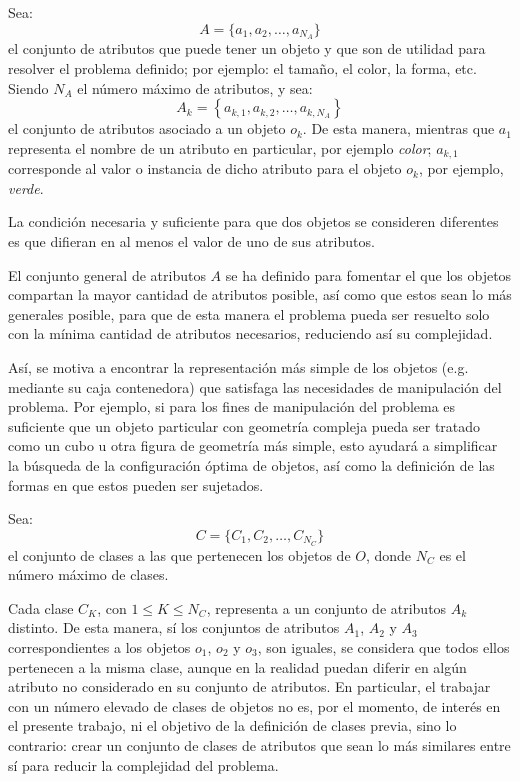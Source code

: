 Sea:
%
\begin{equation}
\label{eq:atributos}
A = \{ a_1, a_2, \ldots, a_{N_A} \}
\end{equation}
%
el conjunto de atributos que puede tener un objeto y que son de utilidad para resolver el problema definido; por ejemplo: el tamaño, el color, la forma, etc.  
Siendo $N_A$ el número máximo de atributos, y sea:
%
\begin{equation}
\label{eq:atributos_objeto}
A_k = \left\{ a_{k, 1}, a_{k, 2}, \ldots, a_{k, N_A} \right\}
\end{equation}
%
el conjunto de atributos asociado a un objeto $o_k$. 
De esta manera, mientras que $a_{1}$ representa el nombre de un atributo en particular, por ejemplo \textit{color}; $a_{k, 1}$ corresponde al valor o instancia de dicho atributo para el objeto $o_k$, por ejemplo, \textit{verde}.

La condición necesaria y suficiente para que dos objetos se consideren diferentes es que difieran en al menos el valor de uno de sus atributos.

El conjunto general de atributos $A$ se ha definido para fomentar el que los objetos compartan la mayor cantidad de atributos posible, así como que estos sean lo más generales posible, para que de esta manera el problema pueda ser resuelto solo con la mínima cantidad de atributos necesarios, reduciendo así su complejidad.

Así, se motiva a encontrar la representación más simple de los objetos (e.g. mediante su caja contenedora) que satisfaga las necesidades de manipulación del problema.
Por ejemplo, si para los fines de manipulación del problema es suficiente que un objeto particular con geometría compleja pueda ser tratado como un cubo u otra figura de geometría más simple, esto ayudará a simplificar la búsqueda de la configuración óptima de objetos, así como la definición de las formas en que estos pueden ser sujetados.

Sea:
%
\begin{equation}
\label{eq:clases}
C = \{ C_1, C_2, \ldots, C_{N_C} \}
\end{equation}
%
el conjunto de clases a las que pertenecen los objetos de $O$, donde $N_C$  es el número máximo de clases.

Cada clase $C_K$, con $1 \leq K \leq N_C$, representa a un conjunto de atributos $A_k$ distinto. 
De esta manera, sí los conjuntos de atributos $A_1$, $A_2$ y $A_3$ correspondientes a los objetos $o_1$, $o_2$ y $o_3$, son iguales, se considera que todos ellos pertenecen a la misma clase, aunque en la realidad puedan diferir en algún atributo no considerado en su conjunto de atributos.
En particular, el trabajar con un número elevado de clases de objetos no es, por el momento, de interés en el presente trabajo, ni el objetivo de la definición de clases previa, sino lo contrario: crear un conjunto de clases de atributos que sean lo más similares entre sí para reducir la complejidad del problema.

